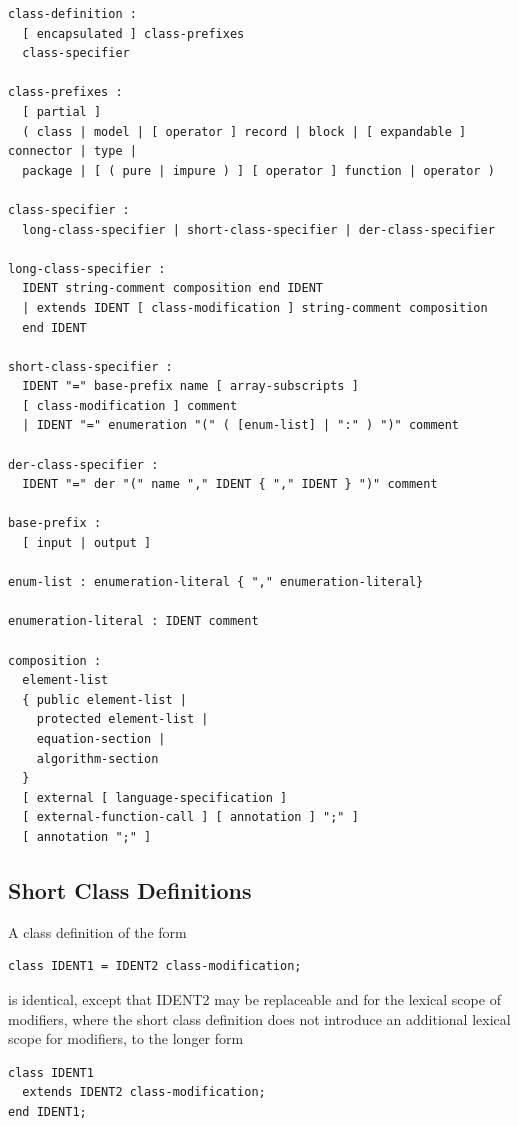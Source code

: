 \documentclass[10pt,a4paper]{report}
\def\doublelabel#1{\label{#1}}
\begin{document}
\begin{lstlisting}[language=grammar]
class-definition :
  [ encapsulated ] class-prefixes  
  class-specifier
  
class-prefixes :
  [ partial ]
  ( class | model | [ operator ] record | block | [ expandable ] connector | type |
  package | [ ( pure | impure ) ] [ operator ] function | operator )
  
class-specifier :
  long-class-specifier | short-class-specifier | der-class-specifier

long-class-specifier :
  IDENT string-comment composition end IDENT
  | extends IDENT [ class-modification ] string-comment composition
  end IDENT
  
short-class-specifier :
  IDENT "=" base-prefix name [ array-subscripts ]
  [ class-modification ] comment
  | IDENT "=" enumeration "(" ( [enum-list] | ":" ) ")" comment
  
der-class-specifier :
  IDENT "=" der "(" name "," IDENT { "," IDENT } ")" comment
  
base-prefix :
  [ input | output ]
  
enum-list : enumeration-literal { "," enumeration-literal}

enumeration-literal : IDENT comment

composition :
  element-list
  { public element-list |
    protected element-list |
    equation-section |
    algorithm-section
  }
  [ external [ language-specification ]
  [ external-function-call ] [ annotation ] ";" ]
  [ annotation ";" ]
\end{lstlisting}

\subsection{Short Class Definitions}\doublelabel{short-class-definitions}

A class definition of the form
\begin{lstlisting}[language=modelica]
class IDENT1 = IDENT2 class-modification;
\end{lstlisting}

is identical, except that IDENT2 may be replaceable and for the lexical
scope of modifiers, where the short class definition does not introduce
an additional lexical scope for modifiers, to the longer form

\begin{lstlisting}[language=modelica]
class IDENT1
  extends IDENT2 class-modification;
end IDENT1;
\end{lstlisting}
\end{document}
